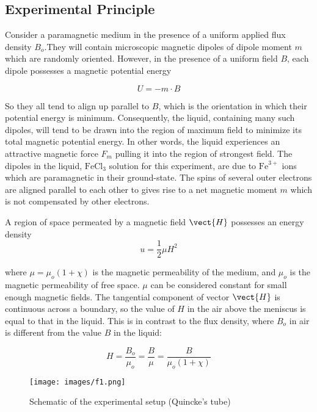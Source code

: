 \subsection{Experimental Principle}

Consider a paramagnetic medium in the presence of a uniform applied flux density $B_o$.They will contain microscopic magnetic dipoles of dipole moment $m$ which are randomly oriented. However, in the presence of a uniform field $B$, each dipole possesses a magnetic potential energy 

\begin{equation}
    U = -m\cdot B
\end{equation}

So they all tend to align up parallel to $B$, which is the orientation in
which their potential energy is minimum. Consequently, the liquid, containing many such dipoles, will tend to be drawn into the region of maximum field to  minimize its total magnetic potential energy. In other words, the liquid experiences an attractive magnetic force $F_m$ pulling it into the region of strongest field. The dipoles in the liquid, $\text{FeCl}_3$ solution for this experiment, are due to $\text{Fe}^{3+}$ ions which are paramagnetic in their ground-state. The spins of several outer electrons are aligned parallel to each other to gives rise to a net magnetic moment $m$ which is not compensated by other electrons. 

A region of space permeated by a magnetic field $\vect{H}$ possesses an energy  density
\begin{equation}
    u = \frac{1}{2}\mu H^2
\end{equation}

where $\mu = \mu_o (1+\chi)$ is the magnetic permeability of the medium, and $\mu_o$ is the magnetic permeability of free space. $\mu$ can be considered constant for small enough magnetic fields. The tangential component of vector $\vect{H}$ is continuous across a boundary, so the value of $H$ in the air above the meniscus is equal to that in the liquid. This is in contrast to the flux density, where $B_o$ in air is different from the value $B$ in the liquid: 

\begin{equation}
    H = \frac{B_o}{\mu_o} = \frac{B}{\mu} = \frac{B}{\mu_o (1+\chi)}
\end{equation}

\begin{figure}
    \centering
    \texttt{[image: images/f1.png]}
    \caption{Schematic of the experimental setup (Quincke's tube)}
    \label{fig:1}
\end{figure}

